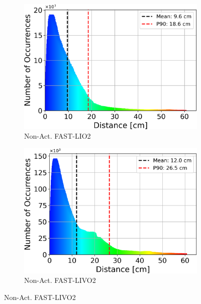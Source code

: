 \documentclass[english, bachelor, utf8]{base/thesis_telematics}
\begin{document}
\begin{figure}
\begin{subfigure}{0.45\textwidth}
    \centering
    \includegraphics[width=\textwidth]{pics/histogram_results/histogram_cond_non_actuated_lio.png}
    \caption{Non-Act. FAST-LIO2}
    \label{fig:hist_non_lio}
\end{subfigure}
\begin{subfigure}{0.45\textwidth}
    \centering
    \includegraphics[width=\textwidth]{pics/histogram_results/histogram_cond_non_actuated_livo.png}
    \caption{Non-Act. FAST-LIVO2}
    \label{fig:hist_non_livo}
\end{subfigure}







\end{figure}
\end{document}
